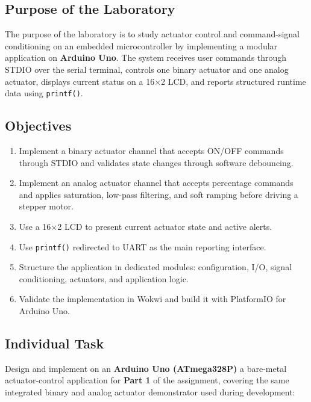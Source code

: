 \documentclass[12pt]{article}
\begin{document}
\subsection*{Purpose of the Laboratory}
\hspace{0.8cm} The purpose of the laboratory is to study actuator control and command-signal conditioning on an embedded microcontroller by implementing a modular application on \textbf{Arduino Uno}. The system receives user commands through STDIO over the serial terminal, controls one binary actuator and one analog actuator, displays current status on a 16$\times$2 LCD, and reports structured runtime data using \texttt{printf()}.

\subsection*{Objectives}
\begin{enumerate}
    \item Implement a binary actuator channel that accepts ON/OFF commands through STDIO and validates state changes through software debouncing.
    \item Implement an analog actuator channel that accepts percentage commands and applies saturation, low-pass filtering, and soft ramping before driving a stepper motor.
    \item Use a 16$\times$2 LCD to present current actuator state and active alerts.
    \item Use \texttt{printf()} redirected to UART as the main reporting interface.
    \item Structure the application in dedicated modules: configuration, I/O, signal conditioning, actuators, and application logic.
    \item Validate the implementation in Wokwi and build it with PlatformIO for Arduino Uno.
\end{enumerate}

\subsection*{Individual Task}
\hspace{0.8cm} Design and implement on an \textbf{Arduino Uno (ATmega328P)} a bare-metal actuator-control application for \textbf{Part 1} of the assignment, covering the same integrated binary and analog actuator demonstrator used during development:
\end{document}

